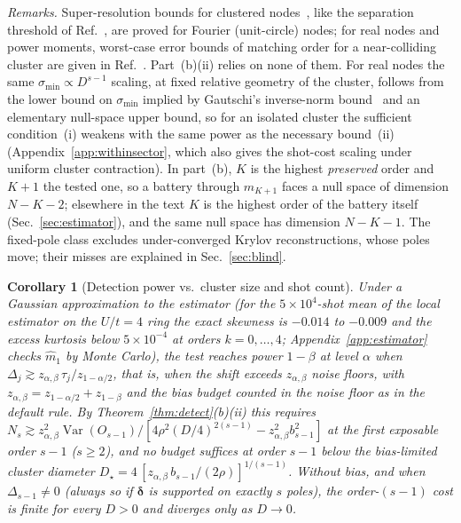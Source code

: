 \documentclass[submission, PhysCore]{SciPost}
\begin{document}
\noindent\emph{Remarks.} Super-resolution bounds for clustered nodes~\cite{BatenkovClustered2020,KunisNagel2021,Donoho1992}, like the separation threshold of Ref.~\cite{Moitra2015}, are proved for Fourier (unit-circle) nodes; for real nodes and power moments, worst-case error bounds of matching order for a near-colliding cluster are given in Ref.~\cite{AkinshinGoldmanYomdin2021}. Part~(b)(ii) relies on none of them. For real nodes the same $\sigma_{\min}\propto D^{s-1}$ scaling, at fixed relative geometry of the cluster, follows from the lower bound on $\sigma_{\min}$ implied by Gautschi's inverse-norm bound~\cite{Gautschi1962,Gautschi1963} and an elementary null-space upper bound, so for an isolated cluster the sufficient condition~(i) weakens with the same power as the necessary bound~(ii) (Appendix~\ref{app:withinsector}, which also gives the shot-cost scaling under uniform cluster contraction). In part~(b), $K$ is the highest \emph{preserved} order and $K{+}1$ the tested one, so a battery through $m_{K+1}$ faces a null space of dimension $N-K-2$; elsewhere in the text $K$ is the highest order of the battery itself (Sec.~\ref{sec:estimator}), and the same null space has dimension $N-K-1$. The fixed-pole class excludes under-converged Krylov reconstructions, whose poles move; their misses are explained in Sec.~\ref{sec:blind}.

\ifdefined\corollary\else\newtheorem{corollary}{Corollary}\fi
\begin{corollary}[Detection power vs.\ cluster size and shot count]
\label{cor:power}
Under a Gaussian approximation to the estimator (for the $5\times10^4$-shot mean of the local estimator on the $U/t=4$ ring the exact skewness is $-0.014$ to $-0.009$ and the excess kurtosis below $5\times10^{-4}$ at orders $k=0,\dots,4$; Appendix~\ref{app:estimator} checks $\widehat m_1$ by Monte Carlo), the test reaches power $1-\beta$ at level $\alpha$ when $\Delta_j\gtrsim z_{\alpha,\beta}\,\tau_j/z_{1-\alpha/2}$, that is, when the shift exceeds $z_{\alpha,\beta}$ noise floors, with $z_{\alpha,\beta}=z_{1-\alpha/2}+z_{1-\beta}$ and the bias budget counted in the noise floor as in the default rule. By Theorem~\ref{thm:detect}(b)(ii) this requires $N_s\gtrsim z_{\alpha,\beta}^2\operatorname{Var}(O_{s-1})/[4\rho^2(D/4)^{2(s-1)}-z_{\alpha,\beta}^2 b_{s-1}^2]$ at the first exposable order $s-1$ ($s\ge2$), and no budget suffices at order $s-1$ below the bias-limited cluster diameter $D_\star=4\,[z_{\alpha,\beta}\,b_{s-1}/(2\rho)]^{1/(s-1)}$. Without bias, and when $\Delta_{s-1}\neq0$ (always so if $\bm\delta$ is supported on exactly $s$ poles), the order-$(s-1)$ cost is finite for every $D>0$ and diverges only as $D\to0$.
\end{corollary}
\end{document}
